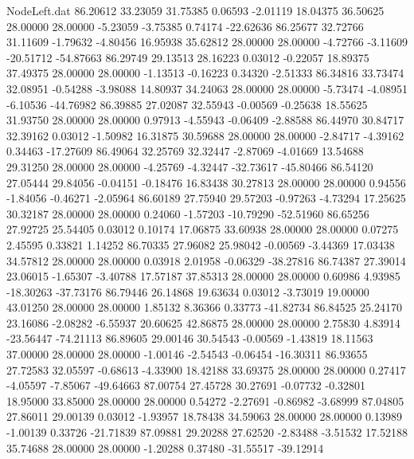 \begin{filecontents}{NodeLeft.dat}
  86.20612   33.23059   31.75385     0.06593   -2.01119   18.04375   36.50625   28.00000   28.00000   -5.23059   -3.75385    0.74174  -22.62636
  86.25677   32.72766   31.11609    -1.79632   -4.80456   16.95938   35.62812   28.00000   28.00000   -4.72766   -3.11609  -20.51712  -54.87663
  86.29749   29.13513   28.16223     0.03012   -0.22057   18.89375   37.49375   28.00000   28.00000   -1.13513   -0.16223    0.34320   -2.51333
  86.34816   33.73474   32.08951    -0.54288   -3.98088   14.80937   34.24063   28.00000   28.00000   -5.73474   -4.08951   -6.10536  -44.76982
  86.39885   27.02087   32.55943    -0.00569   -0.25638   18.55625   31.93750   28.00000   28.00000    0.97913   -4.55943   -0.06409   -2.88588
  86.44970   30.84717   32.39162     0.03012   -1.50982   16.31875   30.59688   28.00000   28.00000   -2.84717   -4.39162    0.34463  -17.27609
  86.49064   32.25769   32.32447    -2.87069   -4.01669   13.54688   29.31250   28.00000   28.00000   -4.25769   -4.32447  -32.73617  -45.80466
  86.54120   27.05444   29.84056    -0.04151   -0.18476   16.83438   30.27813   28.00000   28.00000    0.94556   -1.84056   -0.46271   -2.05964
  86.60189   27.75940   29.57203    -0.97263   -4.73294   17.25625   30.32187   28.00000   28.00000    0.24060   -1.57203  -10.79290  -52.51960
  86.65256   27.92725   25.54405     0.03012    0.10174   17.06875   33.60938   28.00000   28.00000    0.07275    2.45595    0.33821    1.14252
  86.70335   27.96082   25.98042    -0.00569   -3.44369   17.03438   34.57812   28.00000   28.00000    0.03918    2.01958   -0.06329  -38.27816
  86.74387   27.39014   23.06015    -1.65307   -3.40788   17.57187   37.85313   28.00000   28.00000    0.60986    4.93985  -18.30263  -37.73176
  86.79446   26.14868   19.63634     0.03012   -3.73019   19.00000   43.01250   28.00000   28.00000    1.85132    8.36366    0.33773  -41.82734
  86.84525   25.24170   23.16086    -2.08282   -6.55937   20.60625   42.86875   28.00000   28.00000    2.75830    4.83914  -23.56447  -74.21113
  86.89605   29.00146   30.54543    -0.00569   -1.43819   18.11563   37.00000   28.00000   28.00000   -1.00146   -2.54543   -0.06454  -16.30311
  86.93655   27.72583   32.05597    -0.68613   -4.33900   18.42188   33.69375   28.00000   28.00000    0.27417   -4.05597   -7.85067  -49.64663
  87.00754   27.45728   30.27691    -0.07732   -0.32801   18.95000   33.85000   28.00000   28.00000    0.54272   -2.27691   -0.86982   -3.68999
  87.04805   27.86011   29.00139     0.03012   -1.93957   18.78438   34.59063   28.00000   28.00000    0.13989   -1.00139    0.33726  -21.71839
  87.09881   29.20288   27.62520    -2.83488   -3.51532   17.52188   35.74688   28.00000   28.00000   -1.20288    0.37480  -31.55517  -39.12914

\end{filecontents}

